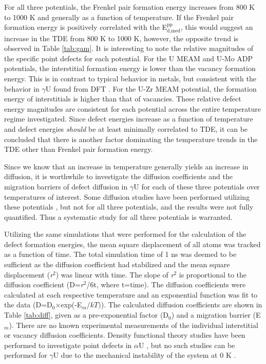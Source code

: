 \documentclass[review]{elsarticle}
\begin{document}
\FloatBarrier

For all three potentials, the Frenkel pair formation energy increases from 800 K to 1000 K and generally as a function of temperature. If the Frenkel pair formation energy is positively correlated with the E$^{\textrm{pp}}_{\textrm{d,med}}$, this would suggest an increase in the TDE from 800 K to 1000 K, however, the opposite trend is observed in Table \ref{tab:gam}. It is interesting to note the relative magnitudes of the specific point defects for each potential. For the U MEAM and U-Mo ADP potentials, the interstitial formation energy is lower than the vacancy formation energy. This is in contrast to typical behavior in metals, but consistent with the behavior in $\gamma$U found from DFT \cite{beeler2010}. For the U-Zr MEAM potential, the formation energy of interstitials is higher than that of vacancies. These relative defect energy magnitudes are consistent for each potential across the entire temperature regime investigated. Since defect energies increase as a function of temperature and defect energies \textit{should} be at least minimally correlated to TDE, it can be concluded that there is another factor dominating the temperature trends in the TDE other than Frenkel pair formation energy.

\FloatBarrier

Since we know that an increase in temperature generally yields an increase in diffusion, it is worthwhile to investigate the diffusion coefficients and the migration barriers of defect diffusion in $\gamma$U for each of these three potentials over temperatures of interest. Some diffusion studies have been performed utilizing these potentials \cite{smirnovaADP, smirnova2015}, but not for all three potentials, and the results were not fully quantified. Thus a systematic study for all three potentials is warranted.

Utilizing the same simulations that were performed for the calculation of the defect formation energies, the mean square displacement of all atoms was tracked as a function of time. The total simulation time of 1 ns was deemed to be sufficient as the diffusion coefficient had stabilized and the mean square displacement (\textit{r}$^{2}$) was linear with time. The slope of \textit{r}$^{2}$ is proportional to the diffusion coefficient (D=\textit{r}$^{2}$/6t, where t=time). The diffusion coefficients were calculated at each respective temperature and an exponential function was fit to the data (D=D$_{0}$$\times$exp(-E$_{m}/kT)$). The calculated diffusion coefficients are shown in Table \ref{tab:diff}, given as a pre-exponential factor (D$_{0}$) and a migration barrier (E$_{m}$). There are no known experimental measurements of the individual interstitial or vacancy diffusion coefficients. Density functional theory studies have been performed to investigate point defects in $\alpha$U \cite{wirth2011}, but no such studies can be performed for $\gamma$U due to the mechanical instability of the system at 0 K \cite{beeler2010}.
\end{document}
